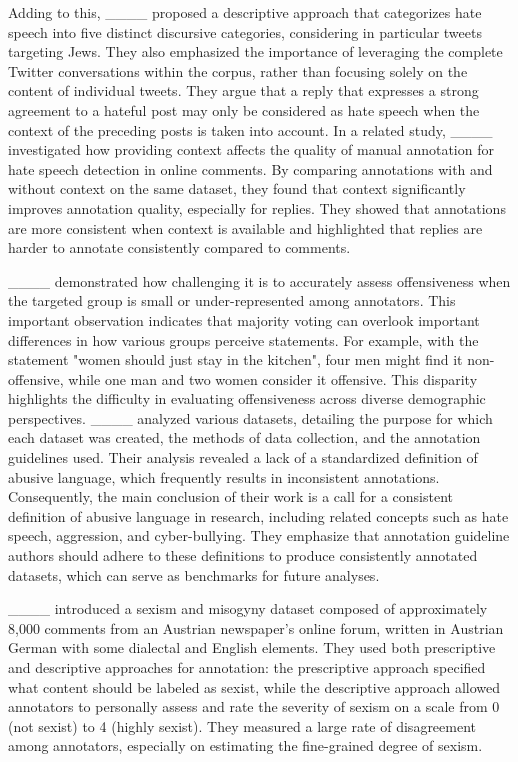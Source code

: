 Adding to this, ____ proposed a descriptive approach that categorizes hate speech into five distinct discursive categories, considering in particular tweets targeting Jews. %
They also emphasized the importance of leveraging the complete Twitter conversations within the corpus, rather than focusing solely on the content of individual tweets. They argue that a reply that expresses a strong agreement to a hateful post may only be considered as hate speech when the context of the preceding posts is taken into account. 
%
In a related study, ____ investigated how providing context affects the quality of manual annotation for hate speech detection in online comments. By comparing annotations with and without context on the same dataset, they found that context significantly improves annotation quality, especially for replies. They showed that annotations are more consistent when context is available and highlighted that replies are harder to annotate consistently compared to comments.

____ demonstrated how challenging it is to accurately assess offensiveness when the targeted group is small or under-represented among annotators. This important observation indicates that majority voting can overlook important differences in how various groups perceive statements. For example, with the statement "women should just stay in the kitchen", four men might find it non-offensive, while one man and two women consider it offensive. This disparity highlights the difficulty in evaluating offensiveness across diverse demographic perspectives.
____ analyzed various datasets, detailing the purpose for which each dataset was created, the methods of data collection, and the annotation guidelines used. Their analysis revealed a lack of a standardized definition of abusive language, which frequently results in inconsistent annotations. Consequently, the main conclusion of their work is a call for a consistent definition of abusive language in research, including related concepts such as hate speech, aggression, and cyber-bullying. They emphasize that annotation guideline authors should adhere to these definitions to produce consistently annotated datasets, which can serve as benchmarks for future analyses.

____ introduced a sexism and misogyny dataset composed of approximately 8,000 comments from an Austrian newspaper's online forum, written in Austrian German with some dialectal and English elements. They used both prescriptive and descriptive approaches for annotation: the prescriptive approach specified what content should be labeled as sexist, while the descriptive approach allowed annotators to personally assess and rate the severity of sexism on a scale from 0 (not sexist) to 4 (highly sexist). They measured a large rate of disagreement among annotators, especially on estimating the fine-grained degree of sexism. %

